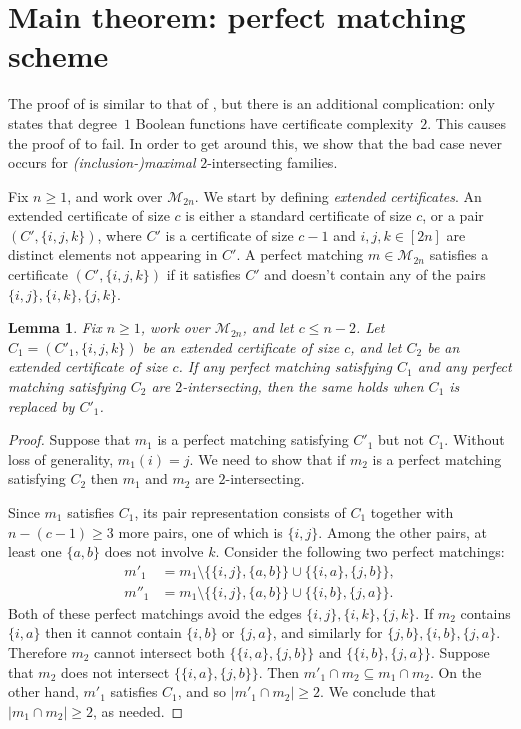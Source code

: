 \documentclass{article}
\newtheorem{lemma}[theorem]{Lemma}
\theoremstyle{definition}
\providecommand{\cM}{\mathcal{M}}
\begin{document}
\section{Main theorem: perfect matching scheme} \label{sec:main-pms}

The proof of  is similar to that of , but there is an additional complication:  only states that degree~$1$ Boolean functions have certificate complexity~$2$. This causes the proof of  to fail. In order to get around this, we show that the bad case never occurs for \emph{(inclusion-)maximal} $2$-intersecting families.

Fix $n \geq 1$, and work over $\cM_{2n}$. We start by defining \emph{extended certificates}. An extended certificate of size $c$ is either a standard certificate of size $c$, or a pair $(C',\{i,j,k\})$, where $C'$ is a certificate of size $c-1$ and $i,j,k \in [2n]$ are distinct elements not appearing in $C'$. A perfect matching $m \in \cM_{2n}$ satisfies a certificate $(C',\{i,j,k\})$ if it satisfies $C'$ and doesn't contain any of the pairs $\{i,j\},\{i,k\},\{j,k\}$.

\begin{lemma} \label{lem:extended-certificates}
Fix $n \geq 1$, work over $\cM_{2n}$, and let $c \leq n - 2$. Let $C_1 = (C'_1,\{i,j,k\})$ be an extended certificate of size $c$, and let $C_2$ be an extended certificate of size $c$. If any perfect matching satisfying $C_1$ and any perfect matching satisfying $C_2$ are $2$-intersecting, then the same holds when $C_1$ is replaced by $C'_1$.
\end{lemma}
\begin{proof}
Suppose that $m_1$ is a perfect matching satisfying $C'_1$ but not $C_1$. Without loss of generality, $m_1(i) = j$. We need to show that if $m_2$ is a perfect matching satisfying $C_2$ then $m_1$ and $m_2$ are $2$-intersecting.

Since $m_1$ satisfies $C_1$, its pair representation consists of $C_1$ together with $n-(c-1) \geq 3$ more pairs, one of which is $\{i,j\}$. Among the other pairs, at least one $\{a,b\}$ does not involve $k$. Consider the following two perfect matchings:
\begin{align*}
    m'_1 &= m_1 \setminus \bigl\{\{i,j\}, \{a,b\}\bigr\} \cup \bigl\{ \{i,a\}, \{j,b\} \bigr\}, \\
    m''_1 &= m_1 \setminus \bigl\{\{i,j\}, \{a,b\}\bigr\} \cup \bigl\{ \{i,b\}, \{j,a\} \bigr\}.
\end{align*}
Both of these perfect matchings avoid the edges $\{i,j\},\{i,k\},\{j,k\}$. If $m_2$ contains $\{i,a\}$ then it cannot contain $\{i,b\}$ or $\{j,a\}$, and similarly for $\{j,b\},\{i,b\},\{j,a\}$. Therefore $m_2$ cannot intersect both $\bigl\{ \{i,a\}, \{j,b\} \bigr\}$ and $\bigl\{ \{i,b\}, \{j,a\} \bigr\}$. Suppose that $m_2$ does not intersect $\bigl\{ \{i,a\}, \{j,b\} \bigr\}$. Then $m'_1 \cap m_2 \subseteq m_1 \cap m_2$. On the other hand, $m'_1$ satisfies $C_1$, and so $|m'_1 \cap m_2| \geq 2$. We conclude that $|m_1 \cap m_2| \geq 2$, as needed.
\end{proof}
\end{document}
